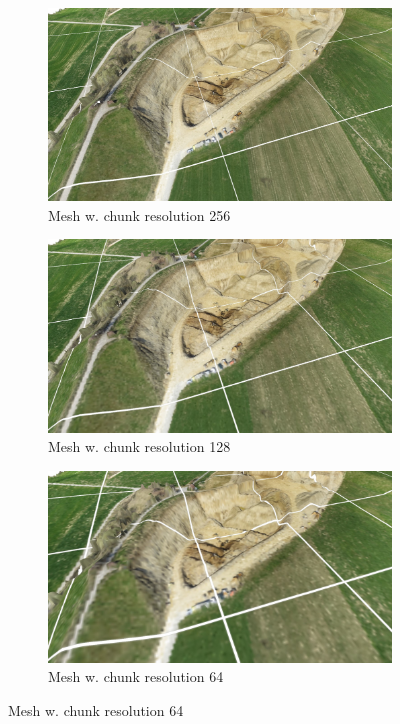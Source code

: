 \begin{figure}[h]
    \centering
    
    \begin{subfigure}{0.45\textwidth}
        \centering
        \includegraphics[width=\textwidth]{mesh-landscape-256.jpg}
        \caption{Mesh w. chunk resolution 256}
        \label{fig:results:mesh-landscape-256}
    \end{subfigure}
    \begin{subfigure}{0.45\textwidth}
        \centering
        \includegraphics[width=\textwidth]{mesh-landscape-128.jpg}
        \caption{Mesh w. chunk resolution 128}
        \label{fig:results:mesh-landscape-128}
    \end{subfigure}
    
    \begin{subfigure}{0.45\textwidth}
        \centering
        \includegraphics[width=\textwidth]{mesh-landscape-64.jpg}
        \caption{Mesh w. chunk resolution 64}
        \label{fig:results:mesh-landscape-64}
    \end{subfigure}
    

\end{figure}
